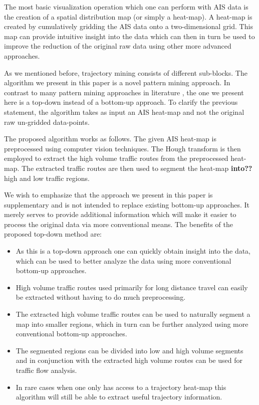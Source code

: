 \documentclass{article}
\begin{document}
The most basic visualization operation which one can perform with AIS data is the creation of a spatial distribution map (or simply a heat-map). A heat-map 
is created by cumulatively gridding the AIS data onto a two-dimensional grid. This map can provide 
intuitive insight into the data which can then in turn be used to improve the reduction of the original raw data using other more advanced approaches.

As we mentioned before, trajectory mining consists of different sub-blocks. The algorithm we present in this paper is a novel pattern mining approach. In contrast to many 
pattern mining approaches in literature \cite{zheng2015}, the one we present here is a top-down instead of a bottom-up approach. To clarify the previous statement, the algorithm 
takes as input an AIS heat-map and not the original raw un-gridded data-points.

The proposed algorithm works as follows. The given AIS heat-map is preprocessed using computer vision techniques. The Hough transform is then employed to extract the high volume traffic routes from the preprocessed heat-map. The extracted traffic routes are then used to segment the 
heat-map \textbf{into??} high and low traffic regions.

We wish to emphasize that the approach we present in this paper is supplementary and is not intended to replace existing bottom-up approaches. It merely serves to provide additional information 
which will make it easier to process the original data via more conventional means.
The benefits of the proposed top-down method are:
\begin{itemize}
 \item As this is a top-down approach one can quickly obtain insight into the data, which can be used to better analyze the data using more conventional bottom-up approaches.
 \item High volume traffic routes used primarily for long distance travel can easily be extracted without having to do much preprocessing. 
 \item The extracted high volume traffic routes can be used to naturally segment a map into smaller regions, which in turn can be further analyzed using more conventional bottom-up approaches.
 \item The segmented regions can be divided into low and high volume segments and in conjunction with the extracted high volume routes can be used for traffic flow analysis.
 \item In rare cases when one only has access to a trajectory heat-map this algorithm will still be able to extract useful trajectory information.
 \end{itemize}
 
\end{document}

